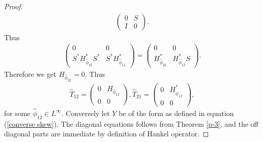 \documentclass[12pt, reqno]{amsart}
\theoremstyle{definition}
\theoremstyle{remark}
\numberwithin{equation}{section}
\begin{document}
\begin{proof}
\begin{align*}
\begin{pmatrix}
                    0&S\\
                    I&0
                \end{pmatrix}.
            \end{align*}
            Thus
            \begin{align*}
                \begin{pmatrix}
                    0&0\\
                    S^*H^*_{\hat{\phi}_{22}}S^*&S^*H^*_{\hat{\phi}_{11}}
                \end{pmatrix}=
                \begin{pmatrix}
                    0&0\\
                    H^*_{\hat{\phi}_{22}}&H^*_{\hat{\phi}_{12}}S
                \end{pmatrix}.
            \end{align*}
            Therefore we get $H_{\hat{\phi}_{22}}=0.$
            Thus
            \begin{align*}
                \hat{T}_{12}=
                \begin{pmatrix}
                0&H_{\hat{\phi}_{12}}\\
                0&0
                \end{pmatrix},
                \hat{T}_{21}=
                \begin{pmatrix}
                0&H^*_{\hat{\phi}_{12}}\\
                0&0
                \end{pmatrix},
            \end{align*}
            for some ${\hat{\phi}_{12}} \in L^\infty.$ Conversely let $Y$ be of the form as defined in equation (\ref{converse skew}). The diagonal equations follows from Theorem \ref{p-3}, and the off diagonal parts are immediate by definition of Hankel operator.
       \end{proof}
\end{document}
